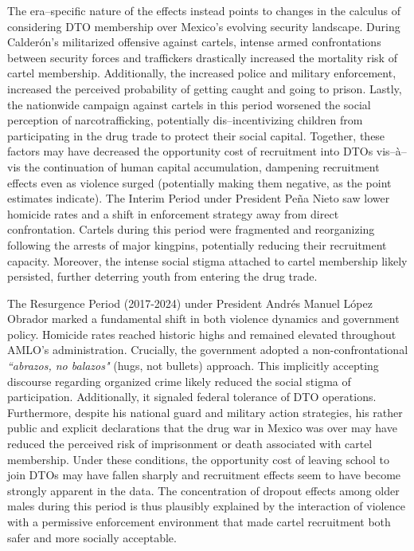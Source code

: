 \documentclass[12pt,letter,english,intoc,bibliography=totoc,index=totoc,BCOR10mm,captions=tableheading,nottitlepage,fleqn]{article}
\theoremstyle{break}
\begin{document}
The era--specific nature of the effects instead points to changes in the calculus of considering DTO membership over Mexico's evolving security landscape. During Calder\'{o}n's militarized offensive against cartels, intense armed confrontations between security forces and traffickers drastically increased the mortality risk of cartel membership. Additionally, the increased police and military enforcement, increased the perceived probability of getting caught and going to prison. Lastly, the nationwide campaign against cartels in this period worsened the social perception of narcotrafficking, potentially dis--incentivizing children from participating in the drug trade to protect their social capital. Together, these factors may have decreased the opportunity cost of recruitment into DTOs vis--\`{a}--vis the continuation of human capital accumulation, dampening recruitment effects even as violence surged (potentially making them negative, as the point estimates indicate). The Interim Period under President Pe\~{n}a Nieto saw lower homicide rates and a shift in enforcement strategy away from direct confrontation. Cartels during this period were fragmented and reorganizing following the arrests of major kingpins, potentially reducing their recruitment capacity. Moreover, the intense social stigma attached to cartel membership likely persisted, further deterring youth from entering the drug trade.

The Resurgence Period (2017-2024) under President Andr\'{e}s Manuel L\'{o}pez Obrador marked a fundamental shift in both violence dynamics and government policy. Homicide rates reached historic highs and remained elevated throughout AMLO's administration. Crucially, the government adopted a non-confrontational \textit{``abrazos, no balazos"} (hugs, not bullets) approach. This implicitly accepting discourse regarding organized crime likely reduced the social stigma of participation. Additionally, it signaled federal tolerance of DTO operations. Furthermore, despite his national guard and military action strategies, his rather public and explicit declarations that the drug war in Mexico was over may have reduced the perceived risk of imprisonment or death associated with cartel membership. Under these conditions, the opportunity cost of leaving school to join DTOs may have fallen sharply and recruitment effects seem to have become strongly apparent in the data. The concentration of dropout effects among older males during this period is thus plausibly explained by the interaction of violence with a permissive enforcement environment that made cartel recruitment both safer and more socially acceptable.
\end{document}
